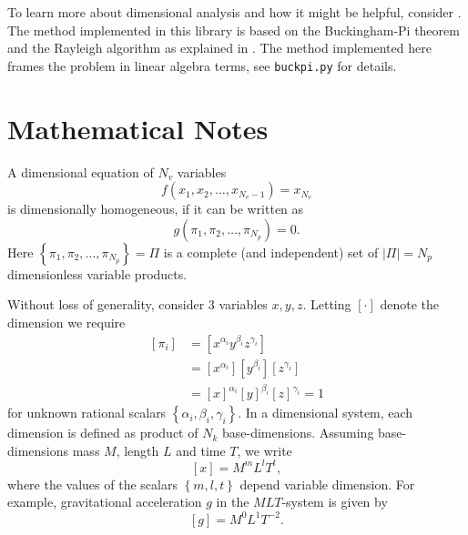\documentclass[11pt]{article}
\begin{document}
To learn more about dimensional analysis and how it might be helpful, consider \cite{szirtes2007applied, santiago2019first, sonin2001dimensional, lemons2017student,schetz1999fundamentals}. The method implemented in this library is based on the Buckingham-Pi theorem and the Rayleigh algorithm as explained in \cite{szirtes2007applied}. The method implemented here frames the problem in linear algebra terms, see \texttt{buckpi.py} for details.

\section{Mathematical Notes}
A dimensional equation of $N_v$ variables
\begin{equation}
    f(x_1,x_2,\ldots,x_{N_v-1}) = x_{N_v} \label{eq:fnc}
\end{equation}
is dimensionally homogeneous, if it can be written as
\begin{equation}
    g(\pi_1,\pi_2,\ldots,\pi_{N_p}) = 0.
\end{equation}
Here $\left\{\pi_1,\pi_2,\ldots,\pi_{N_p}\right\} = \Pi$ is a complete (and independent) set of $|\Pi|={N_p}$ dimensionless variable products. 

Without loss of generality, consider 3 variables $x,y,z$. Letting $\left[\cdot\right]$ denote the dimension we require
\begin{align}
    \left[\pi_i\right] &= \left[x^{\alpha_i}y^{\beta_i}z^{\gamma_i} \right] \\
    &=\left[x^{\alpha_i}\right]\left[y^{\beta_i}\right]\left[z^{\gamma_i}\right] \\
    &=\left[x\right]^{\alpha_i}\left[y\right]^{\beta_i}\left[z\right]^{\gamma_i} = 1 \label{eq:pi}    
\end{align}
for unknown rational scalars $\left\{\alpha_i,\beta_i,\gamma_i\right\}.$ In a dimensional system, each dimension is defined as product of $N_k$ base-dimensions. Assuming base-dimensions mass $M$, length $L$ and time $T$, we write 
\begin{equation}
    \left[x\right] = M^mL^lT^t, \label{eq:xinmlt}
\end{equation}
where the values of the scalars $\left\{m,l,t\right\}$ depend variable dimension. For example, gravitational acceleration $g$ in the $MLT$-system is given by
\begin{equation}
    \left[g\right] = M^0L^1T^{-2}.
\end{equation}
\end{document}
